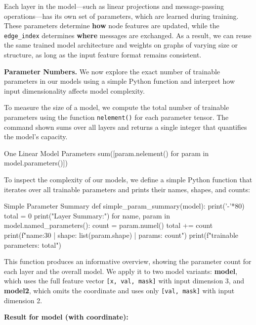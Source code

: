 Each layer in the model—such as linear projections and message-passing operations—has its own set of parameters, which are learned during training. These parameters determine {\bf how} node features are updated, while the {\tt edge\_index} determines {\bf where} messages are exchanged. As a result, we can reuse the same trained model architecture and weights on graphs of varying size or structure, as long as the input feature format remains consistent.

{\bf Parameter Numbers.} We now explore the exact number of trainable parameters in our models using a simple Python function and interpret how input dimensionality affects model complexity.

To measure the size of a model, we compute the total number of trainable parameters using the function {\tt nelement()} for each parameter tensor. The command shown sums over all layers and returns a single integer that quantifies the model's capacity.

\begin{codeonly}{One Linear Model Parameters}
sum([param.nelement() for param in model.parameters()])
\end{codeonly}

To inspect the complexity of our models, we define a simple Python function that iterates over all trainable parameters and prints their names, shapes, and counts:

\begin{codeonly}{Simple Parameter Summary}
def simple_param_summary(model):
    print('-'*80)
    total = 0
    print("Layer Summary:")
    for name, param in model.named_parameters():
        count = param.numel()
        total += count
        print(f"{name:30} | shape: {list(param.shape)} | params: {count}")
    print(f"\nTotal trainable parameters: {total}")
\end{codeonly}

This function produces an informative overview, showing the parameter count for each layer and the overall model. We apply it to two model variants: {\bf model}, which uses the full feature vector \texttt{[x, val, mask]} with input dimension 3, and {\bf model2}, which omits the coordinate and uses only \texttt{[val, mask]} with input dimension 2.

\vspace{1em}
{\bf Result for model (with coordinate):}

